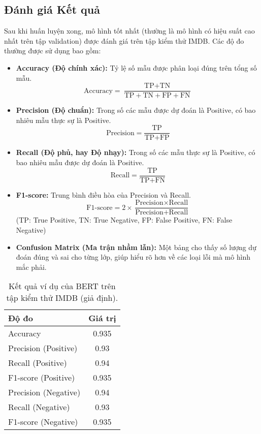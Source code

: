 \subsection{Đánh giá Kết quả}
\label{ssec:danh_gia_ket_qua_sa}
Sau khi huấn luyện xong, mô hình tốt nhất (thường là mô hình có hiệu suất cao nhất trên tập validation) được đánh giá trên tập kiểm thử IMDB. Các độ đo thường được sử dụng bao gồm:
\begin{itemize}
    \item \textbf{Accuracy (Độ chính xác):} Tỷ lệ số mẫu được phân loại đúng trên tổng số mẫu.
    $$ \text{Accuracy} = \frac{\text{TP} + \text{TN}}{\text{TP} + \text{TN} + \text{FP} + \text{FN}} $$
    \item \textbf{Precision (Độ chuẩn):} Trong số các mẫu được dự đoán là Positive, có bao nhiêu mẫu thực sự là Positive.
    $$ \text{Precision} = \frac{\text{TP}}{\text{TP} + \text{FP}} $$
    \item \textbf{Recall (Độ phủ, hay Độ nhạy):} Trong số các mẫu thực sự là Positive, có bao nhiêu mẫu được dự đoán là Positive.
    $$ \text{Recall} = \frac{\text{TP}}{\text{TP} + \text{FN}} $$
    \item \textbf{F1-score:} Trung bình điều hòa của Precision và Recall.
    $$ \text{F1-score} = 2 \times \frac{\text{Precision} \times \text{Recall}}{\text{Precision} + \text{Recall}} $$
    (TP: True Positive, TN: True Negative, FP: False Positive, FN: False Negative)
    \item \textbf{Confusion Matrix (Ma trận nhầm lẫn):} Một bảng cho thấy số lượng dự đoán đúng và sai cho từng lớp, giúp hiểu rõ hơn về các loại lỗi mà mô hình mắc phải.
\end{itemize}

\begin{table}[H]
    \centering
    \caption{Kết quả ví dụ của BERT trên tập kiểm thử IMDB (giả định).}
    \label{tab:imdb_results_example}
    \begin{tabular}{lc}
        \toprule
        \textbf{Độ đo} & \textbf{Giá trị} \\
        \midrule
        Accuracy & 0.935 \\
        Precision (Positive) & 0.93 \\
        Recall (Positive) & 0.94 \\
        F1-score (Positive) & 0.935 \\
        Precision (Negative) & 0.94 \\
        Recall (Negative) & 0.93 \\
        F1-score (Negative) & 0.935 \\
        \bottomrule
    \end{tabular}
\end{table}


